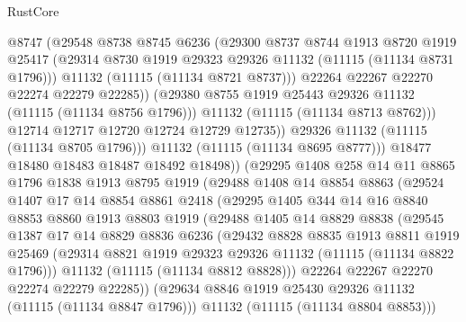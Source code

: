 \begin{lexlean}{RustCore}
\begin{coremodule}
                    @8747
                    (@29548
                      @8738
                      @8745
                      @6236
                      (@29300
                        @8737
                        @8744
                        @1913
                        @8720
                        @1919
                        @25417
                        (@29314 @8730 @1919 @29323 @29326 @11132 (@11115 (@11134 @8731 @1796)))
                        @11132
                        (@11115 (@11134 @8721 @8737)))
                      @22264
                      @22267
                      @22270
                      @22274
                      @22279
                      @22285))
                  (@29380 @8755 @1919 @25443 @29326 @11132 (@11115 (@11134 @8756 @1796)))
                  @11132
                  (@11115 (@11134 @8713 @8762)))
                @12714
                @12717
                @12720
                @12724
                @12729
                @12735))
            @29326
            @11132
            (@11115 (@11134 @8705 @1796)))
          @11132
          (@11115 (@11134 @8695 @8777)))
        @18477
        @18480
        @18483
        @18487
        @18492
        @18498))
    (@29295
      @1408
      @258
      @14
      @11
      @8865
      @1796
      @1838
      @1913
      @8795
      @1919
      (@29488
        @1408
        @14
        @8854
        @8863
        (@29524
          @1407
          @17
          @14
          @8854
          @8861
          @2418
          (@29295
            @1405
            @344
            @14
            @16
            @8840
            @8853
            @8860
            @1913
            @8803
            @1919
            (@29488
              @1405
              @14
              @8829
              @8838
              (@29545
                @1387
                @17
                @14
                @8829
                @8836
                @6236
                (@29432
                  @8828
                  @8835
                  @1913
                  @8811
                  @1919
                  @25469
                  (@29314 @8821 @1919 @29323 @29326 @11132 (@11115 (@11134 @8822 @1796)))
                  @11132
                  (@11115 (@11134 @8812 @8828)))
                @22264
                @22267
                @22270
                @22274
                @22279
                @22285))
            (@29634 @8846 @1919 @25430 @29326 @11132 (@11115 (@11134 @8847 @1796)))
            @11132
            (@11115 (@11134 @8804 @8853)))

\end{coremodule}
\end{lexlean}
